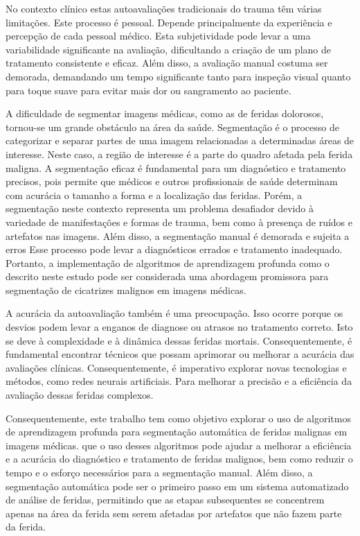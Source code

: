 No contexto clínico estas autoavaliações tradicionais do trauma têm várias limitações. Este processo é pessoal. Depende principalmente da experiência e percepção de cada pessoal médico. Esta subjetividade pode levar a uma variabilidade significante na avaliação, dificultando a criação de um plano de tratamento consistente e eficaz. Além disso, a avaliação manual costuma ser demorada, demandando um tempo significante tanto para inspeção visual quanto para toque suave para evitar mais dor ou sangramento ao paciente. 

A dificuldade de segmentar imagens médicas, como as de feridas dolorosos, tornou-se um grande obstáculo na área da saúde. Segmentação é o processo de categorizar e separar partes de uma imagem relacionadas a determinadas áreas de interesse. Neste caso, a região de interesse é a parte do quadro afetada pela ferida maligna. A segmentação eficaz é fundamental para um diagnóstico e tratamento precisos, pois permite que médicos e outros profissionais de saúde determinam com acurácia o tamanho a forma e a localização das feridas. Porém, a segmentação neste contexto representa um problema desafiador devido à variedade de manifestações e formas de trauma, bem como à presença de ruídos e artefatos nas imagens. Além disso, a segmentação manual é demorada e sujeita a erros Esse processo pode levar a diagnósticos errados e tratamento inadequado. Portanto, a implementação de algoritmos de aprendizagem profunda como o descrito neste estudo pode ser considerada uma abordagem promissora para segmentação de cicatrizes malignos em imagens médicas. 

A acurácia da autoavaliação também é uma preocupação. Isso ocorre porque os desvios podem levar a enganos de diagnose ou atrasos no tratamento correto. Isto se deve à complexidade e à dinâmica dessas feridas mortais. Consequentemente, é fundamental encontrar técnicos que possam aprimorar ou melhorar a acurácia das avaliações clínicas. Consequentemente, é imperativo explorar novas tecnologias e métodos, como redes neurais artificiais. Para melhorar a precisão e a eficiência da avaliação dessas feridas complexos.

Consequentemente, este trabalho tem como objetivo explorar o uso de algoritmos de aprendizagem profunda para segmentação automática de feridas malignas em imagens médicas.  que o uso desses algoritmos pode ajudar a melhorar a eficiência e a acurácia do diagnóstico e tratamento de feridas malignos, bem como reduzir o tempo e o esforço necessários para a segmentação manual. Além disso, a segmentação automática pode ser o primeiro passo em um sistema automatizado de análise de feridas, permitindo que as etapas subsequentes se concentrem apenas na área da ferida sem serem afetadas por artefatos que não fazem parte da ferida.

